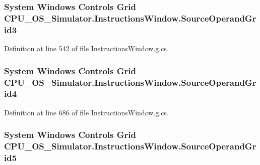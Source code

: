 \subsubsection[{Source\+Operand\+Grid3}]{\setlength{\rightskip}{0pt plus 5cm}System Windows Controls Grid C\+P\+U\+\_\+\+O\+S\+\_\+\+Simulator.\+Instructions\+Window.\+Source\+Operand\+Grid3\hspace{0.3cm}{\ttfamily [package]}}\label{class_c_p_u___o_s___simulator_1_1_instructions_window_ab8409532df6419d7f7ce0c3450807906}


Definition at line 542 of file Instructions\+Window.\+g.\+cs.

\hypertarget{class_c_p_u___o_s___simulator_1_1_instructions_window_ac28180235c174caa7a2870120a9258bb}{}
\subsubsection[{Source\+Operand\+Grid4}]{\setlength{\rightskip}{0pt plus 5cm}System Windows Controls Grid C\+P\+U\+\_\+\+O\+S\+\_\+\+Simulator.\+Instructions\+Window.\+Source\+Operand\+Grid4\hspace{0.3cm}{\ttfamily [package]}}\label{class_c_p_u___o_s___simulator_1_1_instructions_window_ac28180235c174caa7a2870120a9258bb}


Definition at line 686 of file Instructions\+Window.\+g.\+cs.

\hypertarget{class_c_p_u___o_s___simulator_1_1_instructions_window_a3066f4664c81bacc6decdf84d08e74a9}{}
\subsubsection[{Source\+Operand\+Grid5}]{\setlength{\rightskip}{0pt plus 5cm}System Windows Controls Grid C\+P\+U\+\_\+\+O\+S\+\_\+\+Simulator.\+Instructions\+Window.\+Source\+Operand\+Grid5\hspace{0.3cm}{\ttfamily [package]}}\label{class_c_p_u___o_s___simulator_1_1_instructions_window_a3066f4664c81bacc6decdf84d08e74a9}


